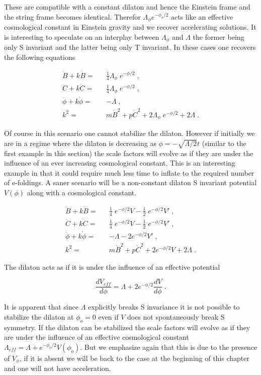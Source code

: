 \documentclass[aps,floatfix,twocolumn,amsmath]{revtex4}
\newcommand{\be}{\begin{equation}}
\newcommand{\ee}{\end{equation}}
\newcommand{\bea}{\begin{eqnarray}}
\newcommand{\eea}{\end{eqnarray}}
\begin{document}
\noindent These are compatible with a constant dilaton and hence the Einstein frame and the string frame becomes identical. Therefor $\Lambda_{\phi}e^{-\phi_{o}/2}$ acts like an effective cosmological constant in Einstein gravity and we recover accelerating solutions. 
It is interesting to speculate on an interplay between $\Lambda_{\phi}$ and $\Lambda$ the former being only S invariant and the latter being only T invariant. In these cases one recovers the following equations

\begin{subequations}
\bea
\ddot{B}+k\dot{B}=&&\frac{1}{4}\Lambda_{\phi}\;e^{-\phi/2}\;,\\
\ddot{C}+k\dot{C}=&& \frac{1}{4}\Lambda_{\phi}\;e^{-\phi/2}\;,\\
\ddot{\phi}+k\dot{\phi}=&& -\Lambda\;,\\
k^{2}=&&m\dot{B}^{2}+p\dot{C}^{2}+2\Lambda_{\phi}\;e^{-\phi/2}+2\Lambda \;.
\eea
\end{subequations}

Of course in this scenario one cannot stabilize the dilaton. However if initially we are in a regime where the dilaton is decreasing as $\phi=-\sqrt{\Lambda/2}t$ (similar to the first example in this section) the scale factors will evolve as if they are under the influence of an ever increasing cosmological constant. This is an interesting example in that it could require much less time to inflate to the required number of e-foldings. A saner scenario will be  a non-constant dilaton S invariant potential $V(\phi)$ along with a cosmological constant.

\begin{subequations}
\bea
\ddot{B}+k\dot{B}=&&\frac{1}{4}\;e^{-\phi/2}V-\frac{1}{2}\;e^{-\phi/2}V' \;,\\
\ddot{C}+k\dot{C}=&& \frac{1}{4}\;e^{-\phi/2}V-\frac{1}{2}\;e^{-\phi/2}V' \;,\\
\ddot{\phi}+k\dot{\phi}=&& -\Lambda -2e^{-\phi/2}V'\;,\\
k^{2}=&&m\dot{B}^{2}+p\dot{C}^{2}+2e^{-\phi/2}V+2\Lambda\;. 
\eea
\end{subequations}

The dilaton acts as if it is under the influence of an effective potential 

\be
\frac{dV_{eff}}{d\phi}=\Lambda+2e^{-\phi/2}\frac{dV}{d\phi}\;.
\ee

It is apparent that since $\Lambda$ explicitly breaks S invariance it is not possible to stabilize the dilaton at $\phi_{o}=0$  even if $V$ does not spontaneously break S symmetry. If the dilaton can be stabilized the scale factors will evolve as if they are under the influence of an effective cosmological constant $\Lambda_{eff}=\Lambda+e^{-\phi_{o}/2}V(\phi_{o})$. But we emphasize again that this is due to the presence of $V_{\phi}$, if it is absent we will be back to the case at the beginning of this chapter and one will not have acceleration.
\end{document}
